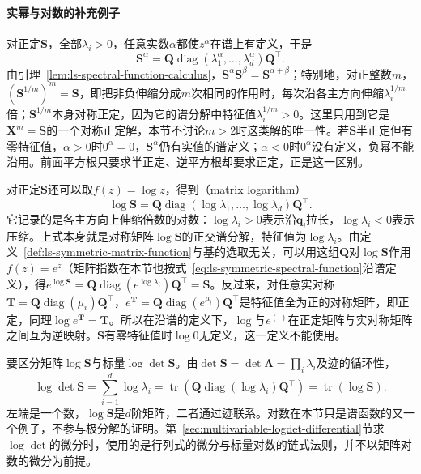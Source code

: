 \paragraph{实幂与对数的补充例子}

对正定$\bm S$，全部$\lambda_i>0$，任意实数$\alpha$都使$z^\alpha$在谱上有定义，于是
\[
 \bm S^\alpha=\bm Q\operatorname{diag}(\lambda_1^\alpha,\ldots,\lambda_d^\alpha)\bm Q^\top .
\]
由引理~\ref{lem:ls-spectral-function-calculus}，$\bm S^\alpha\bm S^\beta=\bm S^{\alpha+\beta}$；特别地，对正整数$m$，$(\bm S^{1/m})^m=\bm S$，即把非负伸缩分成$m$次相同的作用时，每次沿各主方向伸缩$\lambda_i^{1/m}$倍；$\bm S^{1/m}$本身对称正定，因为它的谱分解中特征值$\lambda_i^{1/m}>0$。这里只用到它是$\bm X^m=\bm S$的一个对称正定解，本节不讨论$m>2$时这类解的唯一性。若$\bm S$半正定但有零特征值，$\alpha>0$时$0^\alpha=0$，$\bm S^\alpha$仍有实值的谱定义；$\alpha<0$时$0^\alpha$没有定义，负幂不能沿用。前面平方根只要求半正定、逆平方根却要求正定，正是这一区别。

对正定$\bm S$还可以取$f(z)=\log z$，得到（matrix logarithm）
\[
 \log\bm S=\bm Q\operatorname{diag}(\log\lambda_1,\ldots,\log\lambda_d)\bm Q^\top .
\]
它记录的是各主方向上伸缩倍数的对数：$\log\lambda_i>0$表示沿$\bm q_i$拉长，$\log\lambda_i<0$表示压缩。上式本身就是对称矩阵$\log\bm S$的正交谱分解，特征值为$\log\lambda_i$。由定义~\ref{def:ls-symmetric-matrix-function}与基的选取无关，可以用这组$\bm Q$对$\log\bm S$作用$f(z)=e^z$（矩阵指数在本节也按式~\eqref{eq:ls-symmetric-spectral-function}沿谱定义），得$e^{\log\bm S}=\bm Q\operatorname{diag}(e^{\log\lambda_i})\bm Q^\top=\bm S$。反过来，对任意实对称$\bm T=\bm Q\operatorname{diag}(\mu_i)\bm Q^\top$，$e^{\bm T}=\bm Q\operatorname{diag}(e^{\mu_i})\bm Q^\top$是特征值全为正的对称矩阵，即正定，同理$\log e^{\bm T}=\bm T$。所以在沿谱的定义下，$\log$与$e^{(\cdot)}$在正定矩阵与实对称矩阵之间互为逆映射。$\bm S$有零特征值时$\log0$无定义，这一定义不能使用。

要区分矩阵$\log\bm S$与标量$\log\det\bm S$。由$\det\bm S=\det\bm\Lambda=\prod_i\lambda_i$及迹的循环性，
\[
 \log\det\bm S
 =\sum_{i=1}^d\log\lambda_i
 =\operatorname{tr}(\bm Q\operatorname{diag}(\log\lambda_i)\bm Q^\top)
 =\operatorname{tr}(\log\bm S).
\]
左端是一个数，$\log\bm S$是$d$阶矩阵，二者通过迹联系。对数在本节只是谱函数的又一个例子，不参与极分解的证明。第~\ref{sec:multivariable-logdet-differential}节求$\log\det$的微分时，使用的是行列式的微分与标量对数的链式法则，并不以矩阵对数的微分为前提。
